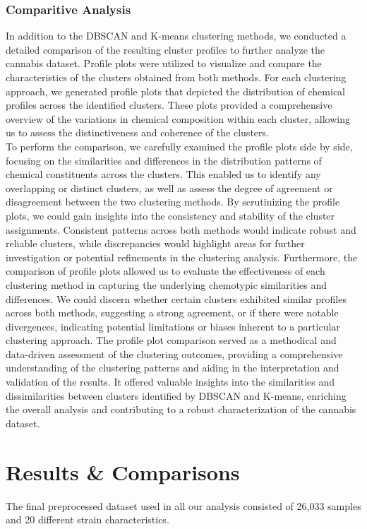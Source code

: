 \documentclass[11pt,a4paper]{article}
\newcommand{\noi}{\noindent}
\begin{document}
\subsubsection{Comparitive Analysis}
In addition to the DBSCAN and K-means clustering methods, we conducted a detailed comparison of the resulting cluster profiles to further analyze the cannabis dataset. Profile plots were utilized to visualize and compare the characteristics of the clusters obtained from both methods. For each clustering approach, we generated profile plots that depicted the distribution of chemical profiles across the identified clusters. These plots provided a comprehensive overview of the variations in chemical composition within each cluster, allowing us to assess the distinctiveness and coherence of the clusters.\\

\noi
To perform the comparison, we carefully examined the profile plots side by side, focusing on the similarities and differences in the distribution patterns of chemical constituents across the clusters. This enabled us to identify any overlapping or distinct clusters, as well as assess the degree of agreement or disagreement between the two clustering methods. By scrutinizing the profile plots, we could gain insights into the consistency and stability of the cluster assignments. Consistent patterns across both methods would indicate robust and reliable clusters, while discrepancies would highlight areas for further investigation or potential refinements in the clustering analysis. Furthermore, the comparison of profile plots allowed us to evaluate the effectiveness of each clustering method in capturing the underlying chemotypic similarities and differences. We could discern whether certain clusters exhibited similar profiles across both methods, suggesting a strong agreement, or if there were notable divergences, indicating potential limitations or biases inherent to a particular clustering approach. The profile plot comparison served as a methodical and data-driven assessment of the clustering outcomes, providing a comprehensive understanding of the clustering patterns and aiding in the interpretation and validation of the results. It offered valuable insights into the similarities and dissimilarities between clusters identified by DBSCAN and K-means, enriching the overall analysis and contributing to a robust characterization of the cannabis dataset.

\section{Results \& Comparisons}
The final preprocessed dataset used in all our analysis consisted of 26,033 samples and 20 different strain characteristics.
\end{document}
